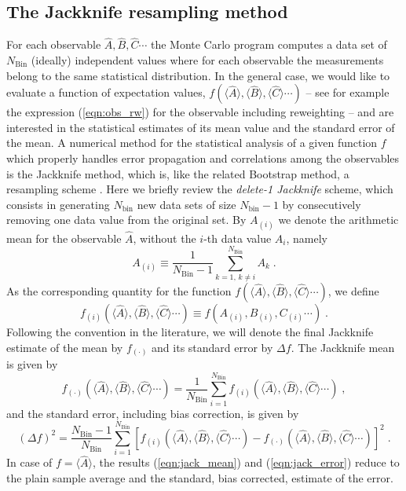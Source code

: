 \subsection{The Jackknife resampling method}\label{sec:jack}
%
For each observable $\hat{A}, \hat{B},\hat{C} \cdots$ the Monte Carlo program computes a data set of $N_{\text{Bin}}$ (ideally) independent values where for each observable the measurements belong to the same  statistical distribution.  In the general case, we would like to evaluate a function of expectation values, $f(\langle \hat{A} \rangle, \langle \hat{B} \rangle, \langle \hat{C} \rangle  \cdots)$ --
see for example the expression (\ref{eqn:obs_rw}) for the observable including reweighting --
and are interested in the statistical estimates of its mean value  and the standard error of the mean.
A numerical method for the statistical analysis of a given function $f$ which properly handles error propagation and correlations among the observables is the Jackknife method, which is, like the related Bootstrap method, a resampling scheme \cite{efron1981}.
Here we briefly review the \textit{delete-1 Jackknife} scheme, which consists in generating $N_{\text{bin}}$ new data sets of size $N_{\text{bin}}-1$ by consecutively removing one data value from the original set. By $A_{(i)}$ we denote the arithmetic mean for the observable $\hat{A}$, without the $i$-th data value $A_{i}$, namely
\begin{equation}
A_{(i)} \equiv \frac{1}{N_{\text{Bin}}-1} \sum\limits_{k=1,\,k\neq i}^{N_{\text{Bin}}} A_{k}\;.
\end{equation}
As the corresponding quantity for  the function $f(\langle \hat{A} \rangle, \langle \hat{B} \rangle, \langle \hat{C} \rangle  \cdots)$, we define 
\begin{equation}
f_{(i)}(\langle \hat{A} \rangle, \langle \hat{B} \rangle, \langle \hat{C} \rangle  \cdots) \equiv
f( A_{(i)}, B_{(i)},C_{(i)}\cdots)\;.
\end{equation}
Following the convention in the literature, we will denote the final Jackknife estimate of the mean by $f_{(\cdot)}$ and its standard error by $\Delta f$. The Jackknife mean is  given by
\begin{equation}
\label{eqn:jack_mean}
f_{(\cdot)}(\langle \hat{A} \rangle, \langle \hat{B} \rangle, \langle \hat{C} \rangle  \cdots) =
\frac{1}{N_{\text{Bin}}}\sum\limits_{i=1}^{N_{\text{Bin}}} f_{(i)}(\langle \hat{A} \rangle, \langle \hat{B} \rangle, \langle \hat{C} \rangle  \cdots)\;,
\end{equation}
and the standard error, including bias correction, is given by
\begin{equation}
\label{eqn:jack_error}
(\Delta f)^{2} = 
\frac{N_{\text{Bin}}-1}{N_{\text{Bin}}} \sum\limits_{i=1}^{N_{\text{Bin}}}
\left[f_{(i)}(\langle \hat{A} \rangle, \langle \hat{B} \rangle, \langle \hat{C} \rangle  \cdots)
- f_{(\cdot)}(\langle \hat{A} \rangle, \langle \hat{B} \rangle, \langle \hat{C} \rangle  \cdots)\right]^{2}\;.
\end{equation}
In case of $f=\langle\hat A\rangle$, the results (\ref{eqn:jack_mean}) and (\ref{eqn:jack_error}) reduce to the plain sample average and the standard, bias corrected, estimate of the error.

